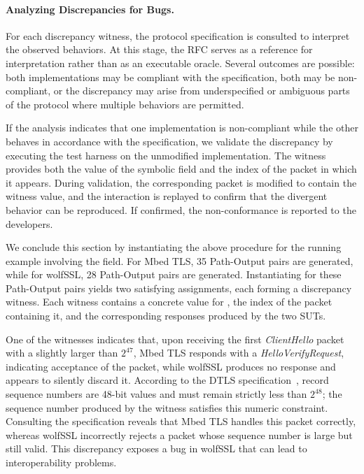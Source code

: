 \paragraph{Analyzing Discrepancies for Bugs.}
For each discrepancy witness, the protocol specification is consulted to interpret the observed behaviors.
At this stage, the RFC serves as a reference for interpretation rather than as an executable oracle.
Several outcomes are possible: both implementations may be compliant with the specification, both may be non-compliant, or the discrepancy may arise from underspecified or ambiguous parts of the protocol where multiple behaviors are permitted.

If the analysis indicates that one implementation is non-compliant while the other behaves in accordance with the specification, we validate the discrepancy by executing the test harness on the unmodified implementation.
The witness provides both the value of the symbolic field and the index of the packet in which it appears.
During validation, the corresponding packet is modified to contain the witness value, and the interaction is replayed to confirm that the divergent behavior can be reproduced.
If confirmed, the non-conformance is reported to the developers.

We conclude this section by instantiating the above procedure for the running example involving the  field.
For Mbed TLS, 35 Path-Output pairs are generated, while for wolfSSL, 28 Path-Output pairs are generated.
Instantiating  for these Path-Output pairs yields two satisfying assignments, each forming a discrepancy witness.
Each witness contains a concrete value for , the index of the packet containing it, and the corresponding responses produced by the two SUTs.

One of the witnesses indicates that, upon receiving the first \emph{ClientHello} packet with a  slightly larger than $2^{47}$, Mbed TLS responds with a \emph{HelloVerifyRequest}, indicating acceptance of the packet, while wolfSSL produces no response and appears to silently discard it.
According to the DTLS specification~\cite[p. 8]{RFC6347}, record sequence numbers are 48-bit values and must remain strictly less than $2^{48}$; the sequence number produced by the witness satisfies this numeric constraint.
Consulting the specification reveals that Mbed TLS handles this packet correctly, whereas wolfSSL incorrectly rejects a packet whose sequence number is large but still valid.
This discrepancy exposes a bug in wolfSSL that can lead to interoperability problems.

